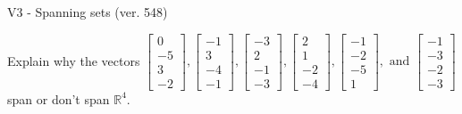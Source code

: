 \begin{exercise}
  \begin{exerciseTitle}V3 - Spanning sets (ver. 548)\end{exerciseTitle}
  \begin{exerciseStatement}
    Explain why the vectors \(\left[\begin{array}{r}
0 \\
-5 \\
3 \\
-2
\end{array}\right] , \left[\begin{array}{r}
-1 \\
3 \\
-4 \\
-1
\end{array}\right] , \left[\begin{array}{r}
-3 \\
2 \\
-1 \\
-3
\end{array}\right] , \left[\begin{array}{r}
2 \\
1 \\
-2 \\
-4
\end{array}\right] , \left[\begin{array}{r}
-1 \\
-2 \\
-5 \\
1
\end{array}\right] , \text{ and } \left[\begin{array}{r}
-1 \\
-3 \\
-2 \\
-3
\end{array}\right]\) span or don't span \(\mathbb{R}^4\). 
	



\end{exerciseStatement}
\end{exercise}
